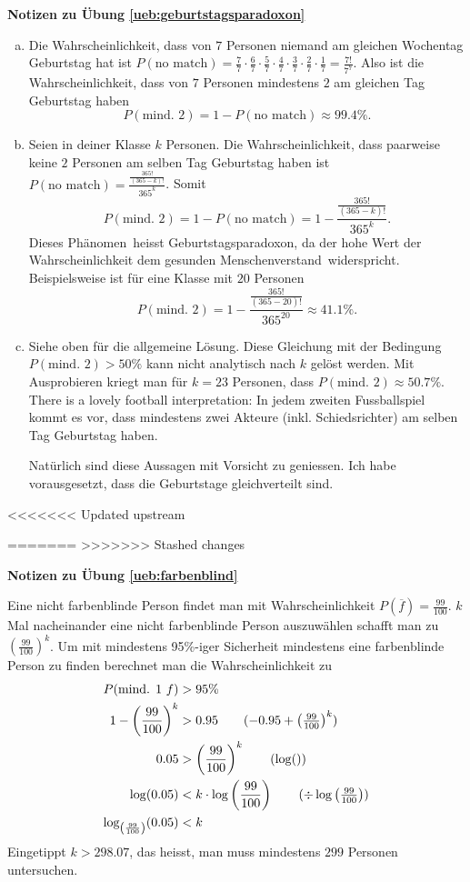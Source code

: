 \documentclass[%
<<<<<<< Updated upstream
11pt,%
twoside,%
titlepage,%
german,%
=======
11pt,%
twoside,%
titlepage,%
swissgerman,%
>>>>>>> Stashed changes
headsepline%
]{scrartcl}
\newcommand{\faReturnGray}{\textcolor{gray}{\faMailReply}} %
\newcommand{\definition}[1]{\colorbox{emerald}{#1}}
\theoremstyle{definition}
\theoremstyle{plain}
\newcommand{\concatueb}[1]{ueb:#1}%
\newcommand{\concatlsg}[1]{lsg:#1}%
\newenvironment{lsg}[1]{%
    \par\noindent\textbf{Notizen zu Übung \ref{\concatueb{#1}}}\label{\concatlsg{#1}}
    \hfill\hyperref[\concatueb{#1}]{\faReturnGray}\par %
}{%
    \par%
}
\newcommand{\concatueb}[1]{ueb:#1}%
\newcommand{\concatlsg}[1]{lsg:#1}%
\newenvironment{lsg}[1]{%
    \par\noindent\textbf{Notizen zu Übung \ref{\concatueb{#1}}.}%
    \label{\concatlsg{#1}}
}{%
    \par%
}
\newcommand{\definition}[1]{\colorbox{emerald}{#1}}
\begin{document}
\begin{lsg}{geburtstagsparadoxon}
\begin{enumerate}[a)]
\item Die Wahrscheinlichkeit, dass von $7$ Personen niemand am gleichen Wochentag Geburtstag hat ist $P(\text{no match})=\frac{7}{7}\cdot\frac{6}{7}\cdot\frac{5}{7}\cdot\frac{4}{7}\cdot\frac{3}{7}\cdot\frac{2}{7}\cdot\frac{1}{7}=\frac{7!}{7^{7}}$. Also ist die Wahrscheinlichkeit, dass von $7$ Personen mindestens $2$ am gleichen Tag Geburtstag haben
$$P(\text{mind. 2})=1-P(\text{no match})\approx99.4\%.$$
\item Seien in deiner Klasse $k$ Personen. Die Wahrscheinlichkeit, dass paarweise keine $2$ Personen am selben Tag Geburtstag haben ist $P(\text{no match})=\frac{\frac{365!}{(365-k)!}}{365^{k}}$. Somit
$$P(\text{mind. 2})=1-P(\text{no match})=1-\frac{\frac{365!}{(365-k)!}}{365^{k}}.$$
Dieses \glqq Ph\"anomen\grqq\ heisst \definition{Geburtstagsparadoxon}, da der hohe Wert der Wahrscheinlichkeit dem \glqq gesunden Menschenverstand\grqq\ widerspricht. Beispielsweise ist f\"ur eine Klasse mit $20$ Personen
$$P(\text{mind. 2})=1-\frac{\frac{365!}{(365-20)!}}{365^{20}}\approx41.1\%.$$
\item Siehe oben f\"ur die allgemeine L\"osung. Diese Gleichung mit der Bedingung $P(\text{mind. 2})>50\%$ kann nicht analytisch nach $k$ gel\"ost werden. Mit Ausprobieren kriegt man f\"ur $k=23$ Personen, dass $P(\text{mind. 2})\approx50.7\%$. There is a lovely football interpretation: In jedem zweiten Fussballspiel kommt es vor, dass mindestens zwei Akteure (inkl. Schiedsrichter) am selben Tag Geburtstag haben.

Nat\"urlich sind diese Aussagen mit Vorsicht zu geniessen. Ich habe vorausgesetzt, dass die Geburtstage gleichverteilt sind.
\end{enumerate}
\end{lsg}

<<<<<<< Updated upstream

=======
>>>>>>> Stashed changes
\begin{lsg}{farbenblind}
Eine nicht farbenblinde Person findet man mit Wahrscheinlichkeit $P(\overline{f})=\frac{99}{100}$. $k$ Mal nacheinander eine nicht farbenblinde Person auszuw\"ahlen schafft man zu $\left(\frac{99}{100}\right)^{k}$. Um mit mindestens 95\%-iger Sicherheit mindestens eine farbenblinde Person zu finden berechnet man die Wahrscheinlichkeit zu
\begin{align*}
P(\text{mind. 1 }f) &> 95\%\\
1-\left(\frac{99}{100}\right)^{k} &> 0.95\tag{$-0.95+\left(\frac{99}{100}\right)^{k}$}\\
0.05 &> \left(\frac{99}{100}\right)^{k} \tag{$\log()$}\\
\log(0.05) &< k\cdot\log\left(\frac{99}{100}\right) \tag{$\div\log\left(\frac{99}{100}\right)$}\\
\log_{\left(\frac{99}{100}\right)}(0.05) &< k
\end{align*}
Eingetippt $k>298.07$, das heisst, man muss mindestens $299$ Personen untersuchen.
\end{lsg}
\end{document}
